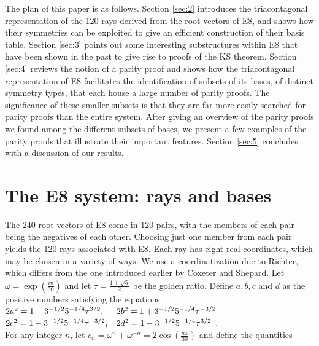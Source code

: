 The plan of this paper is as follows. Section \ref{sec:2} introduces the triacontagonal representation of the 120 rays derived from the root vectors of E8, and shows how their symmetries can be exploited to give an efficient construction of their basis table. Section \ref{sec:3} points out some interesting substructures within E8 that have been shown in the past to give rise to proofs of the KS theorem. Section \ref{sec:4} reviews the notion of a parity proof and shows how the triacontagonal representation of E8 facilitates the identification of subsets of its bases, of distinct symmetry types, that each house a large number of parity proofs. The significance of these smaller subsets is that they are far more easily searched for parity proofs than the entire system. After giving an overview of the parity proofs we found among the different subsets of bases, we present a few examples of the parity proofs that illustrate their important features. Section \ref{sec:5} concludes with a discussion of our results.

\section{\label{sec:2} The E8 system: rays and bases}

The 240 root vectors of E8 come in 120 pairs, with the members of each pair being the negatives of each other. Choosing just one member from each pair yields the 120 rays associated with E8. Each ray has eight real coordinates, which may be chosen in a variety of ways. We use a coordinatization due to Richter\cite{richter}, which differs from the one introduced earlier by Coxeter and Shepard\cite{leonardo}. Let $\omega = \exp(\frac{i\pi}{30})$ and let $\tau = \frac{1+\surd 5}{2}$ be the golden ratio. Define $a,b,c$ and $d$ as the positive numbers satisfying the equations \\

\hspace{5mm} $2a^{2}=1+3^{-1/2}5^{-1/4}\tau^{3/2} , \hspace{5mm} 2b^{2}=1+3^{-1/2}5^{-1/4}\tau^{-3/2}$ \\
\indent
\hspace{5mm} $2c^{2}=1-3^{-1/2}5^{-1/4}\tau^{-3/2} , \hspace{3mm} 2d^{2}=1-3^{-1/2}5^{-1/4}\tau^{3/2}$ .\\

\noindent
For any integer $n$, let $c_{n}=\omega^{n}+\omega^{-n}=2\cos(\frac{n\pi}{30})$ and define the quantities \\

